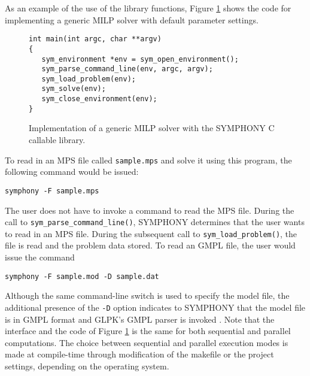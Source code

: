 \noindent As an example of the use of the library functions, Figure
\ref{default_main} shows the code for implementing a generic MILP solver with
default parameter settings.
\begin{figure}[tb]
\begin{Verbatim}[frame=lines]
int main(int argc, char **argv)
{
   sym_environment *env = sym_open_environment();
   sym_parse_command_line(env, argc, argv);
   sym_load_problem(env);
   sym_solve(env);
   sym_close_environment(env);
}
\end{Verbatim}
\caption{Implementation of a generic MILP solver with the SYMPHONY
C callable library. \label{default_main}}
\end{figure}
To read in an MPS file called \texttt{sample.mps} and solve it using 
this program, the following command would be issued: \\
\begin{verbatim}
symphony -F sample.mps
\end{verbatim}
The user does not have to invoke a command to read the MPS file. During the
call to \texttt{sym\_parse\_command\_line()}, SYMPHONY determines that the
user wants to read in an MPS file. During the subsequent call to
\texttt{sym\_load\_problem()}, the file is read and the problem data stored.
To read an GMPL file, the user would issue the command
\begin{verbatim}
symphony -F sample.mod -D sample.dat
\end{verbatim}
Although the same command-line switch is used to specify the model file, the
additional presence of the \texttt{-D} option indicates to SYMPHONY that the
model file is in GMPL format and GLPK's GMPL parser is invoked
\cite{GLPK}. Note that the interface and the code of Figure \ref{default_main}
is the same for both sequential and parallel computations. The choice between
sequential and parallel execution modes is made at compile-time through
modification of the makefile or the project settings, depending on the
operating system.

